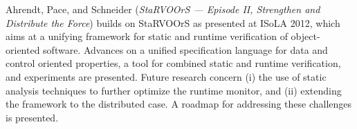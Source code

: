 

Ahrendt, Pace, and Schneider
\cite{isola-2016-ahrendt}
({\em StaRVOOrS — Episode II, Strengthen and Distribute the Force})
builds on StaRVOOrS as presented at ISoLA 2012, which aims at a unifying framework for static and runtime verification of object-oriented software. 
Advances on a unified
specification language for data and control oriented properties, a
tool for combined static and runtime verification, and experiments are
presented. Future research concern (i) the use of static analysis techniques to further optimize the runtime monitor, and (ii) extending the framework to the distributed case. A roadmap for addressing these challenges is presented.

